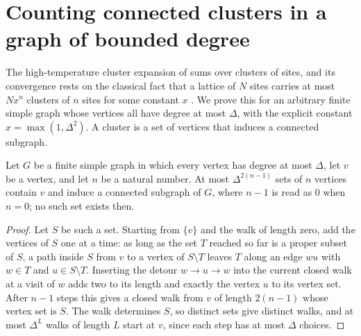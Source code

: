 \section{Counting connected clusters in a graph of bounded degree}
\label{sec:hastings_connected_set_count}


The high-temperature cluster expansion of \cite{Hastings2006Solving} sums over
clusters of sites, and its convergence rests on the classical fact that a
lattice of $N$ sites carries at most $Nx^{n}$ clusters of $n$ sites for some
constant $x$ \cite[lines 1227--1254]{Hastings2006Solving}. We prove this for an
arbitrary finite simple graph whose vertices all have degree at most $\Delta$,
with the explicit constant $x=\max(1,\Delta^{2})$. A cluster is a set of vertices that
induces a connected subgraph.

\begin{lemma}
    \label{thm:hastings_connected_set_count_mem}
    \leanok
    Let $G$ be a finite simple graph in which every vertex has degree at most
    $\Delta$, let $v$ be a vertex, and let $n$ be a natural number. At most
    $\Delta^{2(n-1)}$ sets of $n$ vertices contain $v$ and induce a connected
    subgraph of $G$, where $n-1$ is read as $0$ when $n=0$; no such set
    exists then.
\end{lemma}

\begin{proof}
    \leanok
    Let $S$ be such a set. Starting from $\{v\}$ and the walk of length zero,
    add the vertices of $S$ one at a time: as long as the set $T$ reached so
    far is a proper subset of $S$, a path inside $S$ from $v$ to a vertex of
    $S\setminus T$ leaves $T$ along an edge $wu$ with $w\in T$ and
    $u\in S\setminus T$. Inserting the detour $w\to u\to w$ into the current
    closed walk at a visit of $w$ adds two to its length and exactly the vertex
    $u$ to its vertex set. After $n-1$ steps this gives a closed walk from $v$
    of length $2(n-1)$ whose vertex set is $S$. The walk determines $S$, so
    distinct sets give distinct walks, and at most $\Delta^{L}$ walks of length
    $L$ start at $v$, since each step has at most $\Delta$ choices.
\end{proof}

